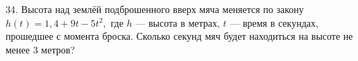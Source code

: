 34. Высота над землёй подброшенного вверх мяча меняется по закону $h(t)=1,4+9t-5t^2,$ где $h$ --- высота в метрах, $t$ --- время в секундах, прошедшее с момента броска. Сколько секунд мяч будет находиться на высоте не менее 3 метров?\\
